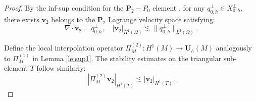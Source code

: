 \documentclass[a4paper,11pt,fleqn]{article}
\numberwithin{equation}{section}
\begin{document}
\begin{proof}
	By the inf-sup condition for the $\boldsymbol{P}_2-P_0$ element \cite[Proposition 8.4.3]{brezzi2012mixed}, for any $q^{\perp}_{0,h} \in X^{\perp}_{0,h}$, there exists $\boldsymbol{v}_2 $ belongs to the $\boldsymbol{P}_2$ Lagrange velocity space satisfying:
	\begin{equation}\label{eq:v2err}
		\nabla \cdot \boldsymbol{v}_2 = q^{\perp}_{0,h}, \quad
		|\boldsymbol{v}_2|_{H^1(\Omega)} \lesssim \|q^{\perp}_{0,h}\|_{L^2(\Omega)}.
	\end{equation}
	
	Define the local interpolation operator $\Pi^{(2)}_M: H^1(M) \rightarrow \boldsymbol{U}_h(M)$ analogously to $\Pi^{(1)}_M$ in Lemma \ref{le:sup1}. The stability estimates on the triangular sub-element $T$ follow similarly:
	\begin{equation}\label{eq:pi_m^2err}
		|\Pi^{(2)}_M \boldsymbol{v}_2|_{H^1(T)} \lesssim |\boldsymbol{v}_2|_{H^1(T)}.
	\end{equation}
	

\end{proof}
\end{document}
